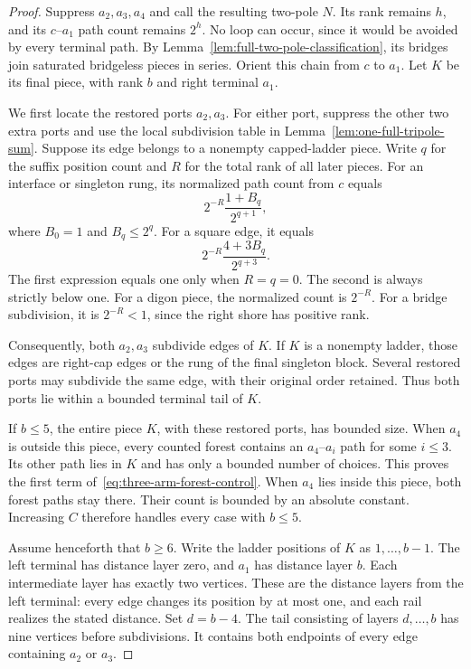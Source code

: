\begin{proof}
Suppress $a_2,a_3,a_4$ and call the resulting two-pole $N$.
Its rank remains $h$, and its $c$--$a_1$ path count remains $2^h$.
No loop can occur, since it would be avoided by every terminal path.
By Lemma~\ref{lem:full-two-pole-classification}, its bridges join saturated bridgeless pieces in series.
Orient this chain from $c$ to $a_1$.
Let $K$ be its final piece, with rank $b$ and right terminal $a_1$.

We first locate the restored ports $a_2,a_3$.
For either port, suppress the other two extra ports and use the local subdivision table in Lemma~\ref{lem:one-full-tripole-sum}.
Suppose its edge belongs to a nonempty capped-ladder piece.
Write $q$ for the suffix position count and $R$ for the total rank of all later pieces.
For an interface or singleton rung, its normalized path count from $c$ equals
\[
 2^{-R}\frac{1+B_q}{2^{q+1}},
\]
where $B_0=1$ and $B_q\le2^q$.
For a square edge, it equals
\[
 2^{-R}\frac{4+3B_q}{2^{q+3}}.
\]
The first expression equals one only when $R=q=0$.
The second is always strictly below one.
For a digon piece, the normalized count is $2^{-R}$.
For a bridge subdivision, it is $2^{-R}<1$, since the right shore has positive rank.

Consequently, both $a_2,a_3$ subdivide edges of $K$.
If $K$ is a nonempty ladder, those edges are right-cap edges or the rung of the final singleton block.
Several restored ports may subdivide the same edge, with their original order retained.
Thus both ports lie within a bounded terminal tail of $K$.

If $b\le5$, the entire piece $K$, with these restored ports, has bounded size.
When $a_4$ is outside this piece, every counted forest contains an $a_4$--$a_i$ path for some $i\le3$.
Its other path lies in $K$ and has only a bounded number of choices.
This proves the first term of~\eqref{eq:three-arm-forest-control}.
When $a_4$ lies inside this piece, both forest paths stay there.
Their count is bounded by an absolute constant.
Increasing $C$ therefore handles every case with $b\le5$.

Assume henceforth that $b\ge6$.
Write the ladder positions of $K$ as $1,\ldots,b-1$.
The left terminal has distance layer zero, and $a_1$ has distance layer $b$.
Each intermediate layer has exactly two vertices.
These are the distance layers from the left terminal: every edge changes its position by at most one, and each rail realizes the stated distance.
Set $d=b-4$.
The tail consisting of layers $d,\ldots,b$ has nine vertices before subdivisions.
It contains both endpoints of every edge containing $a_2$ or $a_3$.


\end{proof}
